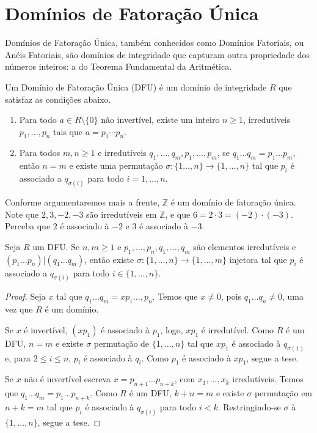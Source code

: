 \section{Domínios de Fatoração Única}
Domínios de Fatoração Única, também conhecidos como Domínios Fatoriais, ou Anéis Fatoriais, são domínios de integridade que capturam outra propriedade dos números inteiros:
a do Teorema Fundamental da Aritmética.

\begin{definition}\label{def:DFU}
    Um Domínio de Fatoração Única (DFU) é um domínio de integridade $R$ que satisfaz as condições abaixo.
    
    \begin{enumerate}
        \item Para todo $a\in R\setminus \{0\}$ não invertível, existe um inteiro $n\geq 1$, irredutíveis $p_1, \dots, p_n$ tais que $a=p_1\cdots p_n$.
        \item Para todos $m, n\geq 1$ e irredutíveis $q_1, \dots, q_m, p_1, \dots, p_m$, se $q_1\dots q_m =p_1\dots p_m$, então $n=m$ e existe uma permutação $\sigma:\{1\dots, n\}\rightarrow \{1, \dots, n\}$ tal que $p_i$ é associado a $q_{\sigma(i)}$ para todo $i=1, \dots, n$.
    \end{enumerate}
\end{definition}

\begin{exemplo}
    Conforme argumentaremos mais a frente, $\mathbb Z$ é um domínio de fatoração única. Note que $2, 3, -2, -3$ são irredutíveis em $\mathbb Z$, e que $6=2\cdot 3=(-2)\cdot(-3)$. Perceba que $2$ é associado à $-2$ e $3$ é associado à $-3$.
\end{exemplo}

\begin{lemma}
    Seja $R$ um DFU. Se $n, m\geq 1$ e $p_1, \dots, p_n, q_1, \dots, q_m$ são elementos irredutíveis e $(p_1\dots p_n)|(q_1\dots q_m)$, então existe $\sigma:\{1, \dots, n\}\rightarrow\{1, \dots, m\}$ injetora tal que $p_i$ é associado a $q_{\sigma(i)}$ para todo $i \in \{1, \dots, n\}$. 
\end{lemma}
\begin{proof}
    Seja $x$ tal que $q_1 \dots q_m=x p_1\dots, p_n$. Temos que $x\neq 0$, pois $q_1\dots q_n\neq 0$, uma vez que $R$ é um domínio.

    Se $x$ é invertível, $(xp_1)$ é associado à $p_1$, logo, $x p_1$ é irredutível. Como $R$ é um DFU, $n=m$ e existe $\sigma$ permutação de $\{1, \dots, n\}$ tal que $xp_1$ é associado à $q_{\sigma(1)}$ e, para $2\leq i\leq n$, $p_i$ é associado à $q_i$. Como $p_1$ é associado à $xp_1$, segue a tese.

    Se $x$ não é invertível escreva $x=p_{n+1}\dots p_{n+k}$, com $x_1, \dots, x_k$ irredutíveis. Temos que $q_1\dots q_m=p_1\dots p_{n+k}$. Como $R$ é um DFU, $k+n=m$ e existe $\sigma$ permutação em $n+k=m$ tal que $p_i$ é associado à $q_{\sigma(i)}$ para todo $i<k$. Restringindo-se $\sigma$ à $\{1, \dots, n\}$, segue a tese.
\end{proof}

